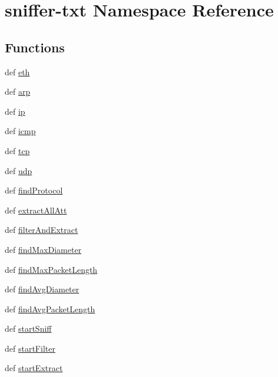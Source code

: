 \hypertarget{namespacesniffer-txt}{\section{sniffer-\/txt Namespace Reference}
\label{namespacesniffer-txt}
}
\subsection*{Functions}
\begin{DoxyCompactItemize}
\item 
def \hyperlink{namespacesniffer-txt_a061fe1f57af0a7458d9e38b6bf1b2a88}{eth}
\item 
def \hyperlink{namespacesniffer-txt_abc65eaac289d33105c95307d68f24769}{arp}
\item 
def \hyperlink{namespacesniffer-txt_abb5456e3f8d74d0e85eb2fc068d42cc4}{ip}
\item 
def \hyperlink{namespacesniffer-txt_afca619ca4d1891b0c7899e4721427c5b}{icmp}
\item 
def \hyperlink{namespacesniffer-txt_a9ad1e72b19f523891ac14d171b8f2b0b}{tcp}
\item 
def \hyperlink{namespacesniffer-txt_a509b189f514c4238d9c28c2bd715f6d0}{udp}
\item 
def \hyperlink{namespacesniffer-txt_a240089abd5c152fb82ce7289fc75d5e1}{find\-Protocol}
\item 
def \hyperlink{namespacesniffer-txt_ae22e9ecb478ea603d637fe90c3fe61a1}{extract\-All\-Att}
\item 
def \hyperlink{namespacesniffer-txt_a6b49db8e892d65b76b00bb9fa0a2ba76}{filter\-And\-Extract}
\item 
def \hyperlink{namespacesniffer-txt_a5a8bc5adccebbb4ddfbed74f77bc5d9a}{find\-Max\-Diameter}
\item 
def \hyperlink{namespacesniffer-txt_a973d635e5691fe63f56aaafe8f862c88}{find\-Max\-Packet\-Length}
\item 
def \hyperlink{namespacesniffer-txt_a44ea72bf1be691bb014367d7ef72f586}{find\-Avg\-Diameter}
\item 
def \hyperlink{namespacesniffer-txt_a3ae8ab6aeb782958f195c93f11f54dd2}{find\-Avg\-Packet\-Length}
\item 
def \hyperlink{namespacesniffer-txt_ae8b20fad336053239242cb921a4ba329}{start\-Sniff}
\item 
def \hyperlink{namespacesniffer-txt_a5ad104bdd8be25d3ab524fabc3e83875}{start\-Filter}
\item 
def \hyperlink{namespacesniffer-txt_ac9ff90e46b3170d01c19e5108b4e7662}{start\-Extract}

\end{DoxyCompactItemize}
